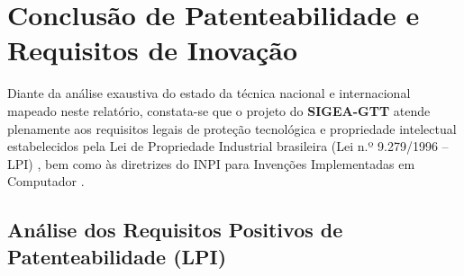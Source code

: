 \chapter{Conclusão de Patenteabilidade e Requisitos de Inovação}
\label{cap_conclusao_patenteabilidade}

Diante da análise exaustiva do estado da técnica nacional e internacional mapeado neste relatório, constata-se que o projeto do \textbf{SIGEA-GTT} atende plenamente aos requisitos legais de proteção tecnológica e propriedade intelectual estabelecidos pela Lei de Propriedade Industrial brasileira (Lei n.º 9.279/1996 -- LPI) \cite{lpi1996}, bem como às diretrizes do INPI para Invenções Implementadas em Computador \cite{inpi2020}.

\section{Análise dos Requisitos Positivos de Patenteabilidade (LPI)}
\label{sec_requisitos_lpi}

